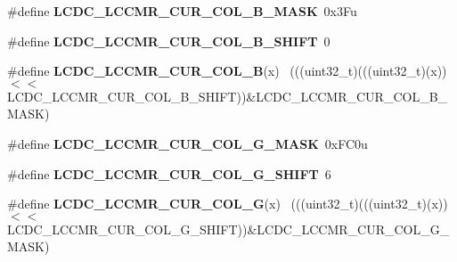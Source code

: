 \begin{DoxyCompactItemize}
\item 
\hypertarget{group___l_c_d_c___register___masks_ga00f620511a91e966b2aa7054225074d4}{}\#define {\bfseries L\+C\+D\+C\+\_\+\+L\+C\+C\+M\+R\+\_\+\+C\+U\+R\+\_\+\+C\+O\+L\+\_\+\+B\+\_\+\+M\+A\+S\+K}~0x3\+Fu\label{group___l_c_d_c___register___masks_ga00f620511a91e966b2aa7054225074d4}

\item 
\hypertarget{group___l_c_d_c___register___masks_ga8bb055edf1ffe704e0f23bac6a7ce0d4}{}\#define {\bfseries L\+C\+D\+C\+\_\+\+L\+C\+C\+M\+R\+\_\+\+C\+U\+R\+\_\+\+C\+O\+L\+\_\+\+B\+\_\+\+S\+H\+I\+F\+T}~0\label{group___l_c_d_c___register___masks_ga8bb055edf1ffe704e0f23bac6a7ce0d4}

\item 
\hypertarget{group___l_c_d_c___register___masks_ga8aa3900b06ab1a0f18f5ee1edb1c5985}{}\#define {\bfseries L\+C\+D\+C\+\_\+\+L\+C\+C\+M\+R\+\_\+\+C\+U\+R\+\_\+\+C\+O\+L\+\_\+\+B}(x)                                ~(((uint32\+\_\+t)(((uint32\+\_\+t)(x))$<$$<$L\+C\+D\+C\+\_\+\+L\+C\+C\+M\+R\+\_\+\+C\+U\+R\+\_\+\+C\+O\+L\+\_\+\+B\+\_\+\+S\+H\+I\+F\+T))\&L\+C\+D\+C\+\_\+\+L\+C\+C\+M\+R\+\_\+\+C\+U\+R\+\_\+\+C\+O\+L\+\_\+\+B\+\_\+\+M\+A\+S\+K)\label{group___l_c_d_c___register___masks_ga8aa3900b06ab1a0f18f5ee1edb1c5985}

\item 
\hypertarget{group___l_c_d_c___register___masks_ga3331cecf59d7d59c980fea8ccef43f13}{}\#define {\bfseries L\+C\+D\+C\+\_\+\+L\+C\+C\+M\+R\+\_\+\+C\+U\+R\+\_\+\+C\+O\+L\+\_\+\+G\+\_\+\+M\+A\+S\+K}~0x\+F\+C0u\label{group___l_c_d_c___register___masks_ga3331cecf59d7d59c980fea8ccef43f13}

\item 
\hypertarget{group___l_c_d_c___register___masks_ga5918fd2f171634da2d3bcb9a9dd0ee44}{}\#define {\bfseries L\+C\+D\+C\+\_\+\+L\+C\+C\+M\+R\+\_\+\+C\+U\+R\+\_\+\+C\+O\+L\+\_\+\+G\+\_\+\+S\+H\+I\+F\+T}~6\label{group___l_c_d_c___register___masks_ga5918fd2f171634da2d3bcb9a9dd0ee44}

\item 
\hypertarget{group___l_c_d_c___register___masks_gad4fc6c813399271b6ef534a800d6ef3f}{}\#define {\bfseries L\+C\+D\+C\+\_\+\+L\+C\+C\+M\+R\+\_\+\+C\+U\+R\+\_\+\+C\+O\+L\+\_\+\+G}(x)                                ~(((uint32\+\_\+t)(((uint32\+\_\+t)(x))$<$$<$L\+C\+D\+C\+\_\+\+L\+C\+C\+M\+R\+\_\+\+C\+U\+R\+\_\+\+C\+O\+L\+\_\+\+G\+\_\+\+S\+H\+I\+F\+T))\&L\+C\+D\+C\+\_\+\+L\+C\+C\+M\+R\+\_\+\+C\+U\+R\+\_\+\+C\+O\+L\+\_\+\+G\+\_\+\+M\+A\+S\+K)\label{group___l_c_d_c___register___masks_gad4fc6c813399271b6ef534a800d6ef3f}


\end{DoxyCompactItemize}
